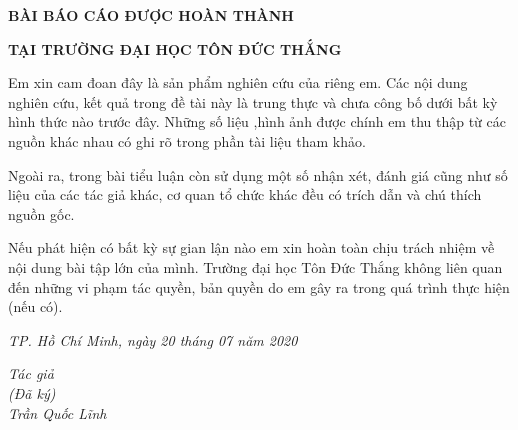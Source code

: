\newpage
\changefontsizes{16pt}
\centerline{\textbf{BÀI BÁO CÁO ĐƯỢC HOÀN THÀNH}}
\centerline{\textbf{TẠI TRƯỜNG ĐẠI HỌC TÔN ĐỨC THẮNG}}
\changefontsizes{13pt}
\vspace{1cm}
\setlength{\parindent}{2cm}
Em xin cam đoan đây là sản phẩm nghiên cứu của riêng em. Các nội dung nghiên cứu, kết quả trong đề tài này là trung thực và chưa công bố dưới bất kỳ hình thức nào trước đây. Những số liệu ,hình ảnh được chính em thu thập từ các nguồn khác nhau có ghi rõ trong phần tài liệu tham khảo.

\setlength{\parindent}{2cm}
Ngoài ra, trong bài tiểu luận còn sử dụng một số nhận xét, đánh giá cũng như số liệu của các tác giả khác, cơ quan tổ chức khác đều có trích dẫn và chú thích nguồn gốc.

\setlength{\parindent}{2cm}
Nếu phát hiện có bất kỳ sự gian lận nào em xin hoàn toàn chịu trách nhiệm về nội dung bài tập lớn của mình. Trường đại học Tôn Đức Thắng không liên quan đến những vi phạm tác quyền, bản quyền do em gây ra trong quá trình thực hiện (nếu có).

\vspace{0.75cm}
\begin{flushright}
	\renewcommand{\baselinestretch}{0.05}
	\changefontsizes{13pt}
	\textit{TP. Hồ Chí Minh, ngày 20 tháng 07 năm 2020}
\end{flushright}

\setlength{\parindent}{12.5cm}
\textit{Tác giả}\\

\setlength{\parindent}{12.5cm}
\textit{(Đã ký)}\\

\setlength{\parindent}{11.75cm}
\textit{Trần Quốc Lĩnh}\\